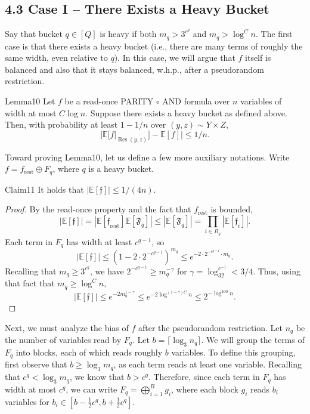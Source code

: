 \subsection*{4.3 Case I -- There Exists a Heavy Bucket}
Say that bucket $q\in[Q]$ is heavy if both $m_q>3^{c^q}$ and $m_q>\log^C n$. The first case is that there exists a heavy bucket (i.e., there are many terms of roughly the same width, even relative to $q$). In this case, we will argue that $f$ itself is balanced and also that it stays balanced, w.h.p., after a pseudorandom restriction.
\begin{authorclaim}{Lemma10}
Let $f$ be a read-once PARITY $\circ$ AND formula over $n$ variables of width at most $C\log n$. Suppose there exists a heavy bucket as defined above. Then, with probability at least $1-1/n$ over $(y,z)\sim Y\times Z$,
\[
|\mathbb E[f|_{\operatorname{Res}(y,z)}]-\mathbb E[f]|\le1/n.
\]
\end{authorclaim}
Toward proving Lemma10, let us define a few more auxiliary notations. Write $f=f_{\mathrm{rest}}\oplus F_q$, where $q$ is a heavy bucket.
\begin{authorclaim}{Claim11}
It holds that $|\mathbb E[\mathfrak f]|\le1/(4n)$.
\end{authorclaim}
\begin{proof}
By the read-once property and the fact that $f_{\mathrm{rest}}$ is bounded,
\[
|\mathbb E[\mathfrak f]|=|\mathbb E[\mathfrak f_{\mathrm{rest}}]\mathbb E[\mathfrak F_q]|
\le|\mathbb E[\mathfrak F_q]|=\prod_{i\in B_q}|\mathbb E[\mathfrak f_i]|.
\]
Each term in $F_q$ has width at least $c^{q-1}$, so
\[
|\mathbb E[\mathfrak f]|\le(1-2\cdot2^{-c^{q-1}})^{m_q}\le e^{-2\cdot2^{-c^{q-1}}\cdot m_q}.
\]
Recalling that $m_q\ge3^{c^q}$, we have $2^{-c^{q-1}}\ge m_q^{-\gamma}$ for $\gamma=\log_32^{c^{-1}}<3/4$. Thus, using that fact that $m_q\ge\log^C n$,
\[
|\mathbb E[\mathfrak f]|\le e^{-2m_q^{1-\gamma}}\le e^{-2\log^{(1-\gamma)C}n}\le2^{-\log^{100}n}.
\]
\end{proof}
Next, we must analyze the bias of $f$ after the pseudorandom restriction. Let $n_q$ be the number of variables read by $F_q$. Let $b=\lceil\log_3n_q\rceil$. We will group the terms of $F_q$ into blocks, each of which reads roughly $b$ variables. To define this grouping, first observe that $b\ge\log_3m_q$, as each term reads at least one variable. Recalling that $c^q<\log_3m_q$, we know that $b>c^q$. Therefore, since each term in $F_q$ has width at most $c^q$, we can write $F_q=\bigoplus_{i=1}^Bg_i$, where each block $g_i$ reads $b_i$ variables for $b_i\in[b-\frac12c^q,b+\frac12c^q]$.
